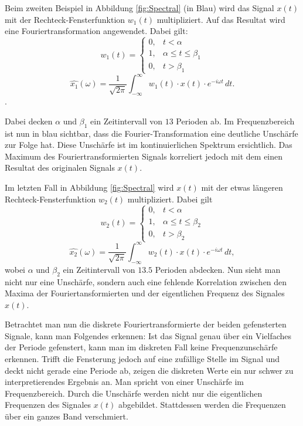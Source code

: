 Beim zweiten Beispiel in Abbildung \ref{fig:Spectral} (in Blau) wird das Signal $x(t)$ mit der Rechteck-Fensterfunktion $w_{1}(t)$ multipliziert. Auf das Resultat wird eine Fouriertransformation angewendet. Dabei gilt: 
\begin{equation}
	w_{1}(t)=  \left\{\begin{array}{lll}{0,} & {t<\alpha}  \\ {1,}&{\alpha\leq t \leq\beta_{1}} \\ {0,} &{t>\beta_{1}}\end{array} \right.
\end{equation}
\begin{equation}
	\hat{x_{1}}(\omega)=\frac{1}{\sqrt{2 \pi}} \int_{-\infty}^{\infty} w_{1}(t)\cdot x(t) \cdot e^{-i \omega t} \,dt.
\end{equation}.

Dabei decken $\alpha$ und $\beta_{1}$ ein Zeitintervall von $13$ Perioden ab. Im Frequenzbereich ist nun in blau sichtbar, dass die Fourier-Transformation eine deutliche Unschärfe zur Folge hat. Diese Unschärfe ist im kontinuierlichen Spektrum ersichtlich. Das Maximum des Fouriertransformierten Signals korreliert jedoch mit dem einen Resultat des originalen Signals $x(t)$.




Im letzten Fall in Abbildung \ref{fig:Spectral} wird $x(t)$ mit der etwas längeren Rechteck-Fensterfunktion $w_{2}(t)$ multipliziert. Dabei gilt 
\begin{equation}
	w_{2}(t)= \left\{ \begin{array}{lll}{0,}&{t<\alpha}  \\ {1,}&{\alpha\leq t \leq\beta_{2}} \\ {0,}&{t>\beta_{2}}\end{array} \right.
\end{equation}
\begin{equation}
	\hat{x_{2}}(\omega)=\frac{1}{\sqrt{2 \pi}} \int_{-\infty}^{\infty} w_{2}(t)\cdot x(t) \cdot e^{-i \omega t} \,dt,
\end{equation}
wobei $\alpha$ und $\beta_{2}$ ein Zeitintervall von $13.5$ Perioden abdecken. Nun sieht man nicht nur eine Unschärfe, sondern auch eine fehlende Korrelation zwischen den Maxima der Fouriertansformierten und der eigentlichen Frequenz des Signales $x(t)$.

Betrachtet man nun die diskrete Fouriertransformierte der beiden gefensterten Signale, kann man Folgendes erkennen: Ist das Signal genau über ein Vielfaches der Periode gefenstert, kann man im diskreten Fall keine Frequenzunschärfe erkennen. Trifft die Fensterung jedoch auf eine zufällige Stelle im Signal und deckt nicht gerade eine Periode ab, zeigen die diskreten Werte ein nur schwer zu interpretierendes Ergebnis an. Man spricht von einer Unschärfe im Frequenzbereich. Durch die Unschärfe werden nicht nur die eigentlichen Frequenzen des Signales $x(t)$ abgebildet. Stattdessen werden die Frequenzen über ein ganzes Band verschmiert.

